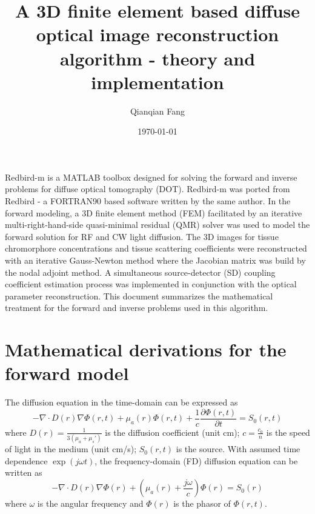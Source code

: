 \documentclass{article}
\title{A 3D finite element based diffuse optical image reconstruction algorithm \-- theory and implementation}
\author{Qianqian Fang}
\date{\today}
\begin{document}
\maketitle              %

Redbird-m is a MATLAB toolbox designed for solving the forward and inverse
problems for diffuse optical tomography (DOT). Redbird-m was ported from 
Redbird - a FORTRAN90 based software written by the same author.
In the forward modeling, a 3D finite element method (FEM)
facilitated by an iterative multi-right-hand-side quasi-minimal residual (QMR) solver was used to model
the forward solution for RF and CW light diffusion. The 3D images for tissue chromorphore 
concentrations and tissue scattering coefficients were
reconstructed with an iterative Gauss-Newton method where the
Jacobian matrix was build by the nodal adjoint method. A simultaneous 
source-detector (SD) coupling coefficient estimation process was 
implemented in conjunction with the optical parameter reconstruction. 
This document summarizes the mathematical treatment for the forward 
and inverse problems used in this algorithm.

\section{Mathematical derivations for the forward model}
The diffusion equation in the time-domain can be expressed as
\begin{equation}
\label{eq:diffusionTD} -\nabla\cdot
D(r)\nabla\Phi(r,t)+\mu_a(r)\Phi(r,t)+\frac{1}{c}\frac{\partial
\Phi(r,t)}{\partial t}=S_0(r,t)
\end{equation}
where $D(r)=\frac{1}{3(\mu_a+\mu_s')}$ is the diffusion
coefficient (unit cm); $c=\frac{c_0}{n}$ is the speed of light in the
medium (unit cm/s); $S_0(r,t)$ is the source. With assumed time dependence
$\exp(j\omega t)$, the frequency-domain (FD) diffusion equation can be
written as
\begin{equation}
\label{eq:diffusionFD} -\nabla\cdot
D(r)\nabla\Phi(r)+\left(\mu_a(r)+\frac{j\omega}{c}\right)\Phi(r)=S_0(r)
\end{equation}
where $\omega$ is the angular frequency and $\Phi(r)$ is the
phasor of $\Phi(r,t)$.
\end{document}

